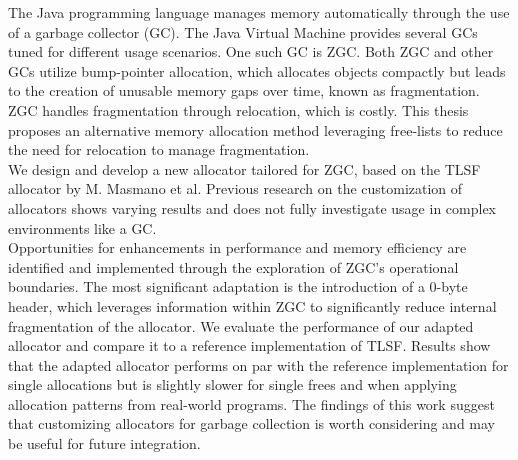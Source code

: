 
The Java programming language manages memory automatically through the use of a garbage collector (GC). The Java Virtual Machine provides several GCs tuned for different usage scenarios. One such GC is ZGC. Both ZGC and other GCs utilize bump-pointer allocation, which allocates objects compactly but leads to the creation of unusable memory gaps over time, known as fragmentation. ZGC handles fragmentation through relocation, which is costly. This thesis proposes an alternative memory allocation method leveraging free-lists to reduce the need for relocation to manage fragmentation.\\

We design and develop a new allocator tailored for ZGC, based on the TLSF allocator by M. Masmano et al. Previous research on the customization of allocators shows varying results and does not fully investigate usage in complex environments like a GC.\\

Opportunities for enhancements in performance and memory efficiency are identified and implemented through the exploration of ZGC's operational boundaries. The most significant adaptation is the introduction of a 0-byte header, which leverages information within ZGC to significantly reduce internal fragmentation of the allocator. We evaluate the performance of our adapted allocator and compare it to a reference implementation of TLSF. Results show that the adapted allocator performs on par with the reference implementation for single allocations but is slightly slower for single frees and when applying allocation patterns from real-world programs. The findings of this work suggest that customizing allocators for garbage collection is worth considering and may be useful for future integration.\\

